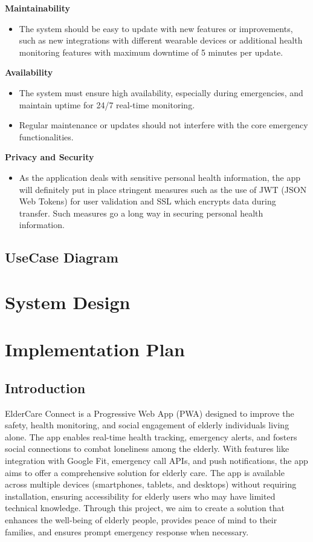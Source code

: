 \documentclass[a4paper, 12pt]{article}
\begin{document}
\textbf{Maintainability }
\begin{itemize}
    \item The system should be easy to update with new features or improvements, such as new integrations with different wearable devices or additional health monitoring features with maximum downtime of 5 minutes per update.
\end{itemize}
\textbf{Availability }
\begin{itemize}
    \item The system must ensure high availability, especially during emergencies, and maintain uptime for 24/7 real-time monitoring.
    \item Regular maintenance or updates should not interfere with the core emergency functionalities.
\end{itemize}
\textbf{Privacy and Security }
\begin{itemize}
    \item As the application deals with sensitive personal health information, the app will definitely put in place stringent measures such as the use of JWT (JSON Web Tokens) for user validation and SSL which encrypts data during transfer. Such measures go a long way in securing personal health information.
\end{itemize}

\subsection{ UseCase Diagram}

\newpage
\section{\textbf{System Design}}
\newpage
\section{\textbf{Implementation Plan}}

\subsection{ Introduction}
ElderCare Connect is a Progressive Web App (PWA) designed to improve the safety, health monitoring, and social engagement of elderly individuals living alone. The app enables real-time health tracking, emergency alerts, and fosters social connections to combat loneliness among the elderly. With features like integration with Google Fit, emergency call APIs, and push notifications, the app aims to offer a comprehensive solution for elderly care.  
The app is available across multiple devices (smartphones, tablets, and desktops) without requiring installation, ensuring accessibility for elderly users who may have limited technical knowledge. Through this project, we aim to create a solution that enhances the well-being of elderly people, provides peace of mind to their families, and ensures prompt emergency response when necessary.
\end{document}
